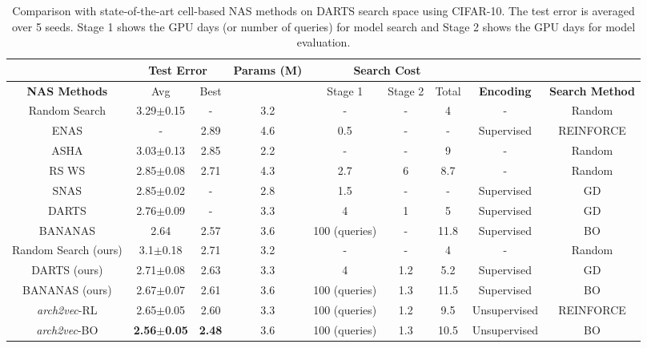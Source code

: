\begin{table}[t] 
  \begin{adjustbox}{width=\columnwidth,center}
  \scriptsize{
  \begin{tabular}{|c|c|c|c|c|c|c|c|c|} 
  \hline
   &   \multicolumn{2}{c|}{\textbf{Test Error}} & \textbf{Params (M)} & \multicolumn{3}{c|}{\textbf{Search Cost}} &  \multicolumn{2}{c|}{}  \\ \hline
  \textbf{NAS Methods} &  Avg & Best &  & Stage 1 & Stage 2 & Total &  \textbf{Encoding} & \textbf{Search Method}           \\ \hline
  Random Search \cite{liu2018darts} & 3.29$\pm$0.15 & - & 3.2 & - & - & 4 & - & Random \\ 
  ENAS \cite{enas} & - & 2.89 & 4.6 & 0.5 & - & - & Supervised & REINFORCE \\ 
  ASHA \cite{Li2019RandomSA} & 3.03$\pm$0.13 & 2.85 & 2.2 & - & - & 9 & - & Random \\ 
  RS WS \cite{Li2019RandomSA} & 2.85$\pm$0.08 & 2.71 & 4.3 & 2.7 & 6 & 8.7 & - & Random \\  
  SNAS \cite{Xie2018SNAS} & 2.85$\pm$0.02 & - & 2.8 & 1.5 & - & - & Supervised & GD \\ 
  DARTS \cite{liu2018darts} & 2.76$\pm$0.09 & - & 3.3 & 4 & 1 & 5 & Supervised & GD \\ 
  BANANAS \cite{white2019bananas} & 2.64 & 2.57 & 3.6 & 100 (queries) & - & 11.8 & Supervised & BO \\ \hline 
  Random Search (ours) & 3.1$\pm$0.18 & 2.71 & 3.2 & - & - & 4 & - & Random  \\ 
  DARTS (ours) & 2.71$\pm$0.08 & 2.63 & 3.3 & 4 & 1.2 & 5.2 & Supervised & GD  \\ 
  BANANAS (ours) & 2.67$\pm$0.07 & 2.61 & 3.6 & 100 (queries) & 1.3 & 11.5 & Supervised & BO \\ \hline
  \textit{arch2vec}-RL & 2.65$\pm$0.05 & 2.60 & 3.3 & 100 (queries) & 1.2 & 9.5 &  Unsupervised & REINFORCE \\ 
  \textit{arch2vec}-BO & \textbf{2.56$\pm$0.05} & \textbf{2.48} & 3.6 & 100 (queries) & 1.3 & 10.5 & Unsupervised & BO \\ \hline  
  \end{tabular} 
  }
  \end{adjustbox}
  \vspace{0.5mm}
  \caption{Comparison with state-of-the-art cell-based NAS methods on DARTS search space using CIFAR-10. The test error is averaged over 5 seeds. Stage 1 shows the GPU days (or number of queries) for model search and Stage 2 shows the GPU days for model evaluation.}
  \vspace{-2mm}
  \label{table:darts}
  \end{table} 


  





